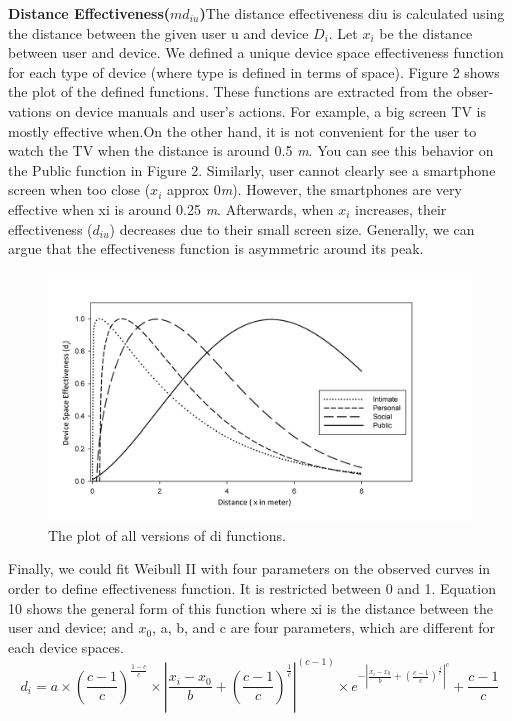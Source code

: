 \documentclass{article}
\begin{document}
\noindent\textbf{Distance Effectiveness($md_{iu}$)}The distance effectiveness diu is calculated using the distance between the given user u and device $D_i$. Let $x_i$ be the distance between user and device. We defined a unique device space effectiveness function for each type of device (where type is defined in terms of space). Figure 2 shows the plot of the defined functions. These functions are extracted from the obser- vations on device manuals and user's actions. For example, a big screen TV is mostly effective when.On the other hand, it is not convenient for the user to watch the TV when the distance is around 0.5 \emph{m}. You can see this behavior on the Public function in Figure 2. Similarly, user cannot clearly see a smartphone screen when too close ($x_i$ approx 0\emph{m}). However, the smartphones are very effective when xi is around 0.25 \emph{m}. Afterwards, when $x_i$ increases, their effectiveness ($d_{iu}$) decreases due to their small screen size. Generally, we can argue that the effectiveness function is asymmetric around its peak.
 \begin{figure}[h!]
    \includegraphics[width=1.0\linewidth,height=0.8\linewidth]{f1.png}
    \caption{The plot of all versions of di functions.}

\end{figure}

Finally, we could fit Weibull II with four parameters on the observed curves in order to define effectiveness function. It is restricted between 0 and 1. Equation 10 shows the general form of this function where xi is the distance between the user and device; and $x_0$, a, b, and c are four parameters, which are different for each device spaces.
 \begin{equation}
             d_i = a \times (\frac{c-1}{c})^\frac{1-c}{c} \times | \frac{x_i-x_0}{b} + (\frac{c-1}{c})^\frac{1}{c} |^{(c-1)} \times e^{-|\frac{x_i-x_0}{b}+(\frac{c-1}{c})^\frac{1}{c}|^c} + \frac{c-1}{c}  
         \end{equation}
\end{document}
